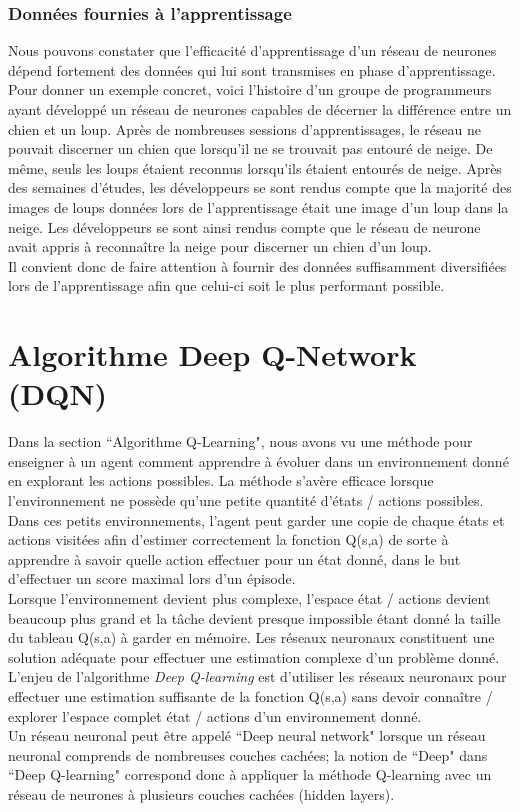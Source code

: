 \documentclass[11pt,a4paper]{report}
\begin{document}
  \subsubsection{Données fournies à l'apprentissage}
  
    \par Nous pouvons constater que l’efficacité d'apprentissage d'un réseau de neurones dépend fortement des données qui lui sont transmises en phase d’apprentissage. Pour donner un exemple concret, voici l'histoire d'un groupe de programmeurs ayant développé un réseau de neurones capables de décerner la différence entre un chien et un loup. Après de nombreuses sessions d'apprentissages, le réseau ne pouvait discerner un chien que lorsqu'il ne se trouvait pas entouré de neige. De même, seuls les loups étaient reconnus lorsqu'ils étaient entourés de neige. Après des semaines d'études, les développeurs se sont rendus compte que la majorité des images de loups données lors de l'apprentissage était une image d'un loup dans la neige. Les développeurs se sont ainsi rendus compte que le réseau de neurone avait appris à reconnaître la neige pour discerner un chien d'un loup. \\
  Il convient donc de faire attention à fournir des données suffisamment diversifiées lors de l'apprentissage afin que celui-ci soit le plus performant possible. 
    
  \section{Algorithme Deep Q-Network (DQN)}
  
    \par Dans la section ``Algorithme Q-Learning", nous avons vu une méthode pour enseigner à un agent comment apprendre à évoluer dans un environnement donné en explorant les actions possibles. La méthode s'avère efficace lorsque l'environnement ne possède qu'une petite quantité d'états / actions possibles. Dans ces petits environnements, l'agent peut garder une copie de chaque états et actions visitées afin d'estimer correctement la fonction Q(s,a) de sorte à apprendre à savoir quelle action effectuer pour un état donné, dans le but d'effectuer un score maximal lors d'un épisode. \\ 
   Lorsque l'environnement devient plus complexe, l'espace état / actions devient beaucoup plus grand et la tâche devient presque impossible étant donné la taille du tableau Q(s,a) à garder en mémoire. Les réseaux neuronaux constituent une solution  adéquate pour effectuer une estimation complexe d'un problème donné. L'enjeu de l'algorithme \textit{Deep Q-learning} est d'utiliser les réseaux neuronaux pour effectuer une estimation suffisante de la fonction Q(s,a) sans devoir connaître / explorer l'espace complet état / actions d'un environnement donné. \\
   Un réseau neuronal peut être appelé ``Deep neural network" lorsque un réseau neuronal comprends de nombreuses couches cachées; la notion de ``Deep" dans ``Deep Q-learning" correspond donc à appliquer la méthode Q-learning avec un réseau de neurones à plusieurs couches cachées (hidden layers). 
   
\end{document}
